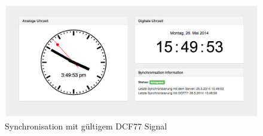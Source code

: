 \begin{figure}[htbp!]
	\caption{Synchronisation mit gültigem DCF77 Signal}
	\centering
		\includegraphics[width=1\textwidth]{./images/screenshots/client_clock_sync_with_dcf77.png}
\end{figure}